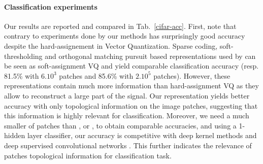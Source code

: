 \documentclass{article}
\begin{document}
\paragraph{Classification experiments} Our results are reported and compared in Tab.~\ref{cifar-acc}. 
First, note that contrary to experiments done by \cite{coates2011analysis} our methods has surprisingly good accuracy despite the hard-assignement in Vector Quantization.
Sparse coding, soft-thresholding and orthogonal matching pursuit based representations used by \cite{coates2011importance, recht2019imagenet} can be seen as soft-assignment VQ and yield comparable classification accuracy (resp. 81.5\% with $6.10^3$ patches and 85.6\% with $2.10^5$ patches).
However, these representations contain much more information than hard-assignment VQ as they allow to reconstruct a large part of the signal.
Our representation yields better accuracy with only topological information on the image patches, suggesting that this information is highly relevant for classification.
Moreover, we need a much smaller of patches than \cite{recht2019imagenet}, \cite{coates2011importance} or \cite{mairal2016end}, to obtain comparable accuracies, and using a 1-hidden layer classifier, our accuracy is competitive with deep kernel methods \citep{li2019enhanced,shankar2020neural} and deep supervised convolutional networks \citep{krizhevsky2012imagenet}.
This further indicates the relevance of patches topological information for classification task.
\end{document}
